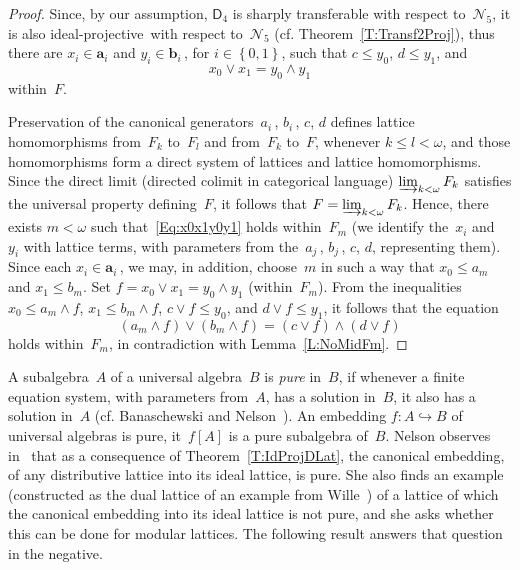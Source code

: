 \documentclass[reqno]{amsart}
\numberwithin{equation}{section}
\theoremstyle{plain}
\theoremstyle{definition}
\theoremstyle{remark}
\numberwithin{figure}{section}
\numberwithin{table}{section}
\begin{document}
\begin{proof}
Since, by our assumption, ${\mathsf{D}_{4}}$ is sharply transferable with respect to~${\mathcal{N}}_5$, it is also {i\-de\-al-pro\-jec\-tive}\ with respect to~${\mathcal{N}}_5$ (cf. Theorem~\ref{T:Transf2Proj}), thus there are $x_i\in{\boldsymbol{a}}_i$ and $y_i\in{\boldsymbol{b}}_i$\,, for $i\in{\left\{{0,1}\right\}}$, such that $c\leq y_0$, $d\leq y_1$, and
 \begin{equation}\label{Eq:x0x1y0y1}
 x_0\vee x_1=y_0\wedge y_1
 \end{equation}
within~$F$.

Preservation of the canonical generators~$a_i$\,, $b_i$\,, $c$, $d$ defines lattice homomorphisms from~$F_k$ to~$F_l$ and from~$F_k$ to~$F$, whenever $k\leq l<{\omega}$, and those homomorphisms form a direct system of lattices and lattice homomorphisms.
Since the direct limit (directed colimit in categorical language) $\varinjlim_{k<{\omega}}F_k$ satisfies the universal property defining~$F$, it follows that $F=\varinjlim_{k<{\omega}}F_k$.
Hence, there exists $m<{\omega}$ such that~\eqref{Eq:x0x1y0y1} holds within~$F_m$ (we identify the~$x_i$ and~$y_i$ with lattice terms, with parameters from the~$a_j$\,, $b_j$\,, $c$, $d$, representing them).
Since each $x_i\in{\boldsymbol{a}}_i$\,, we may, in addition, choose~$m$ in such a way that $x_0\leq a_m$ and $x_1\leq b_m$.
Set $f=x_0\vee x_1=y_0\wedge y_1$ (within~$F_m$).
{}From the inequalities $x_0\leq a_m\wedge f$, $x_1\leq b_m\wedge f$, $c\vee f\leq y_0$, and $d\vee f\leq y_1$, it follows that the equation
 \[
 (a_m\wedge f)\vee(b_m\wedge f)=(c\vee f)\wedge(d\vee f)
 \]
holds within~$F_m$, in contradiction with Lemma~\ref{L:NoMidFm}.
\end{proof}

A subalgebra~$A$ of a universal algebra~$B$ is \emph{pure} in~$B$, if whenever a finite equation system, with parameters from~$A$, has a solution in~$B$, it also has a solution in~$A$ (cf. Banaschewski and Nelson~\cite{BanNels72}).
An embedding $f\colon A\hookrightarrow B$ of universal algebras is pure, it~$f[A]$ is a pure subalgebra of~$B$.
Nelson observes in~\cite{Nels74} that as a consequence of Theorem~\ref{T:IdProjDLat}, the canonical embedding, of any distributive lattice into its ideal lattice, is pure.
She also finds an example (constructed as the dual lattice of an example from Wille~\cite{Wille74}) of a lattice of which the canonical embedding into its ideal lattice is not pure, and she asks whether this can be done for modular lattices.
The following result answers that question in the negative.
\end{document}
